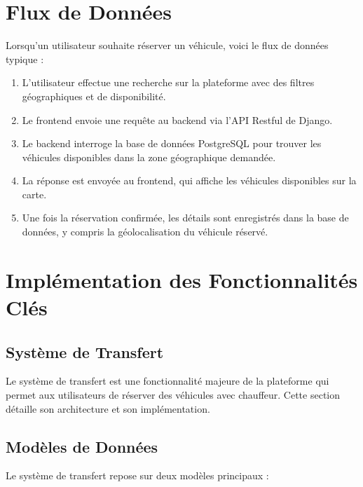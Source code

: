 \section{Flux de Données}
Lorsqu'un utilisateur souhaite réserver un véhicule, voici le flux de données typique :
\begin{enumerate}
    \item L'utilisateur effectue une recherche sur la plateforme avec des filtres géographiques et de disponibilité.
    \item Le frontend envoie une requête au backend via l'API Restful de Django.
    \item Le backend interroge la base de données PostgreSQL pour trouver les véhicules disponibles dans la zone géographique demandée.
    \item La réponse est envoyée au frontend, qui affiche les véhicules disponibles sur la carte.
    \item Une fois la réservation confirmée, les détails sont enregistrés dans la base de données, y compris la géolocalisation du véhicule réservé.
\end{enumerate}

\section{Implémentation des Fonctionnalités Clés}

\subsection{Système de Transfert}

Le système de transfert est une fonctionnalité majeure de la plateforme qui permet aux utilisateurs de réserver des véhicules avec chauffeur. Cette section détaille son architecture et son implémentation.

\subsection{Modèles de Données}
Le système de transfert repose sur deux modèles principaux :

